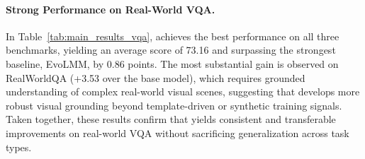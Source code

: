 \paragraph{Strong Performance on Real-World VQA.}
In Table~\ref{tab:main_results_vqa}, \ours achieves the best performance on all three benchmarks, yielding an average score of 73.16 and surpassing the strongest baseline, EvoLMM, by 0.86 points.
The most substantial gain is observed on RealWorldQA (+3.53 over the base model), which requires grounded understanding of complex real-world visual scenes, suggesting that \ours develops more robust visual grounding beyond template-driven or synthetic training signals.
Taken together, these results confirm that \ours yields consistent and transferable improvements on real-world VQA without sacrificing generalization across task types.


